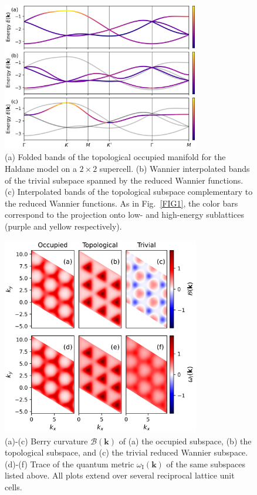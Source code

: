 \documentclass[galley,aps,pra,10pt,amsmath,amssymb,
    superscriptaddress,nofootinbib,longbibliography]{revtex4-2}
\begin{document}
\begin{figure}[t]
\begin{center}
\includegraphics[width=3.4in]{fig7.png}
\end{center}
\vspace{-5mm}
\caption{(a) Folded bands of the topological occupied manifold for the Haldane model on a $2\times 2$ supercell. (b) Wannier interpolated bands of the trivial subspace spanned by the reduced Wannier functions. (c) Interpolated bands of the topological subspace complementary to the reduced Wannier functions. As in Fig.~\ref{FIG1}, the color bars correspond to the projection onto low- and high-energy sublattices (purple and yellow respectively).}
\label{FIG7}
\end{figure}

\begin{figure}[t]
\begin{center}
\includegraphics[width=3.4in]{fig8.png}
\end{center}
\vspace{-8mm}
\caption{(a)-(c) Berry curvature $\mathcal{B}(\textbf{k})$ of (a) the occupied subspace, (b) the topological subspace, and (c) the trivial reduced Wannier subspace. (d)-(f) Trace of the quantum metric $\omega_\textrm{I}(\textbf{k})$ of the same subspaces listed above. All plots extend over several reciprocal lattice unit cells.}
\label{FIG8}
\end{figure}
\end{document}
